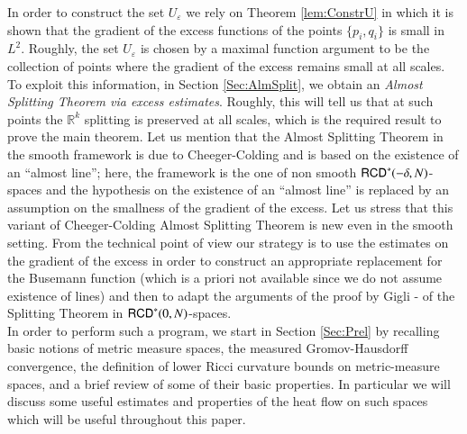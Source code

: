 \documentclass[11pt,reqno]{amsart}
\newcommand{\R}{\mathbb{R}}
\newcommand{\RCD}{{\sf RCD}}
\theoremstyle{definition}
\theoremstyle{remark}
\theoremstyle{remark}
\theoremstyle{remark}
\theoremstyle{remark}
\theoremstyle{remark}
\theoremstyle{remark}
\theoremstyle{remark}
\begin{document}
In order to construct the set $U_\varepsilon$ we rely on Theorem \ref{lem:ConstrU} in which it is shown that the gradient of the excess functions of the points $\{p_i,q_i\}$ is small in $L^2$.  Roughly, the set $U_\varepsilon$ is chosen by a maximal function argument to be the collection of points where the gradient of the excess remains small at all scales.  To exploit this information, in Section \ref{Sec:AlmSplit}, we  obtain an \emph{Almost Splitting Theorem via excess estimates}.  Roughly, this will tell us that at such points the $\R^k$ splitting is preserved at all scales, which is the required result to prove the main theorem.  Let us mention that the Almost Splitting Theorem in the smooth framework is  due to Cheeger-Colding \cite{CC96} and  is based on the existence of an ``almost line'';  here, the framework is the one of non smooth $\RCD^*(-\delta,N)$-spaces and the hypothesis on the existence of an ``almost line''  is replaced by an assumption on the smallness of the gradient of the excess.  Let us stress that this variant of Cheeger-Colding Almost Splitting Theorem is new even in the smooth setting. From the technical point of view our strategy is to use the estimates on the gradient of the excess  in order to construct an appropriate replacement for the Busemann function (which is a priori not available since we do not assume existence of lines) and then to adapt the arguments of the proof by Gigli  \cite{GigliSplitting}-\cite{GigliSplittingSur} of the Splitting Theorem in $\RCD^*(0,N)$-spaces.\\

In order to perform such a program, we start in Section \ref{Sec:Prel} by recalling basic notions of metric measure spaces, the measured Gromov-Hausdorff convergence, the definition of lower Ricci curvature bounds on metric-measure spaces, and a brief review of some of their basic properties.  In particular we will discuss some useful estimates and properties of the heat flow on such spaces which will be useful throughout this paper.\\
\end{document}
